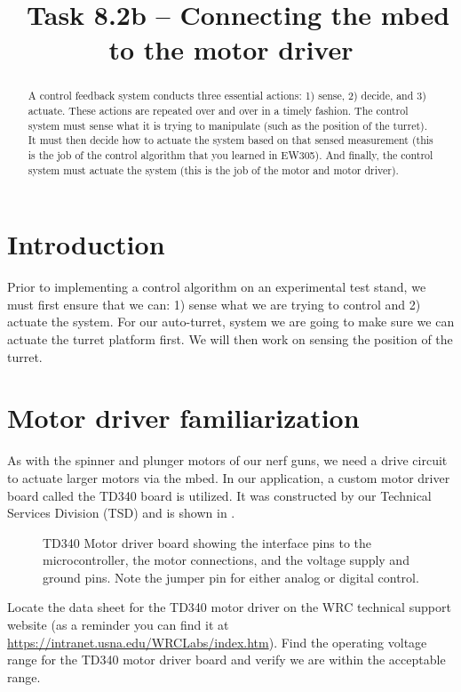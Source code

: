 \documentclass{exam}
\title{\usnaCourseNumber\ Task 8.2b -- Connecting the mbed to the motor driver}
\author{\usnaInstructorShort}
\date{\printdate{\courseWeekSeven}}
\begin{document}
\maketitle

\begin{abstract}
A control feedback system conducts three essential actions: 1) sense, 2) decide, and 3) actuate. These actions are repeated over and over in a timely fashion. The control system must sense what it is trying to manipulate (such as the position of the turret). It must then decide how to actuate the system based on that sensed measurement (this is the job of the control algorithm that you learned in EW305). And finally, the control system must actuate the system (this is the job of the motor and motor driver). 
\end{abstract}

\section{Introduction}
Prior to implementing a control algorithm on an experimental test stand, we must first ensure that we can: 1) sense what we are trying to control and 2) actuate the system.  For our auto-turret, system we are going to make sure we can actuate the turret platform first. We will then work on sensing the position of the turret.

\section{Motor driver familiarization}
As with the spinner and plunger motors of our nerf guns, we need a drive circuit to actuate larger motors via the mbed. In our application, a custom motor driver board called the TD340 board is utilized. It was constructed by our Technical Services Division (TSD) and is shown in .              
\begin{figure}[h]
\caption{TD340 Motor driver board showing the interface pins to the microcontroller, the motor connections, and the voltage supply and ground pins.  Note the jumper pin for either analog or digital control.}
\label{fig:1}
\end{figure}

Locate the data sheet for the TD340 motor driver on the WRC technical support website (as a reminder you can find it at \url{https://intranet.usna.edu/WRCLabs/index.htm}). Find the operating voltage range for the TD340 motor driver board and verify we are within the acceptable range.
\end{document}
